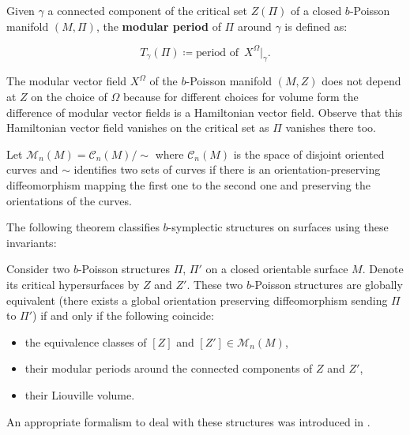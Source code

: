 	\begin{definition} Given $\gamma$ a connected component of {  the critical set $Z(\Pi )$ of a closed $b$-Poisson manifold $(M,\Pi)$},   the \textbf{modular period} of $\Pi$ around $\gamma$ is defined as:
	
	
	$$T_{\gamma}(\Pi )\coloneqq \textrm{period of }\, {X^{\Omega}}|_{\gamma }. $$
	
\end{definition}

{
\begin{remark}
The modular vector field $X^\Omega$ of the $b$-Poisson manifold $(M,Z)$ does not depend at $Z$ on the choice of $\Omega$ because for different choices for volume form the difference of modular vector fields  is a Hamiltonian vector field. Observe that this Hamiltonian vector field vanishes on the critical set as $\Pi$ vanishes there too.
\end{remark}
}

\begin{definition}
{
Let $\mathcal{M}_n(M)=\mathcal{C}_n(M)/\sim$ where $\mathcal{C}_n(M)$ is the space of disjoint oriented curves and $\sim$ identifies two sets of curves if there is an orientation-preserving diffeomorphism mapping the first one to the  second one and preserving the orientations of the curves.
}
\end{definition}


The following theorem classifies $b$-symplectic structures on surfaces using these invariants:
\begin{theorem}\label{Radko}
{Consider two $b$-Poisson structures $\Pi$, $\Pi'$ on {a closed} {orientable} surface $M$. Denote its critical {hypersurfaces} by $Z$ and $Z'$. These two $b$-Poisson structures are globally equivalent (there exists a global {orientation preserving} diffeomorphism sending $\Pi$ to $\Pi'$) if and only if the following coincide}:
	\begin{itemize}
	    \item the equivalence classes of $[Z]$ and $[Z']\in\mathcal{M}_n(M)$,
	    \item their modular periods around the connected components of $Z$ and $Z'$,
	    \item their  Liouville volume.
	\end{itemize}
\end{theorem}



An appropriate formalism to deal with these structures was introduced in \cite{GMP10}.

